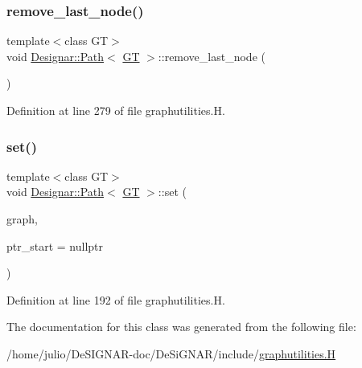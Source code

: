 \subsubsection{\texorpdfstring{remove\+\_\+last\+\_\+node()}{remove\_last\_node()}}
{\footnotesize\ttfamily template$<$class GT$>$ \\
void \hyperlink{class_designar_1_1_path}{Designar\+::\+Path}$<$ \hyperlink{demo-buildgraph_8_c_a3001c40d2c31ca87ed96cd7d1334a55e}{GT} $>$\+::remove\+\_\+last\+\_\+node (\begin{DoxyParamCaption}{ }\end{DoxyParamCaption})\hspace{0.3cm}{\ttfamily [inline]}}



Definition at line 279 of file graphutilities.\+H.

\mbox{\label{class_designar_1_1_path_a72190e285c2c85aae75b0c8435f1eee9}} 
\subsubsection{\texorpdfstring{set()}{set()}}
{\footnotesize\ttfamily template$<$class GT$>$ \\
void \hyperlink{class_designar_1_1_path}{Designar\+::\+Path}$<$ \hyperlink{demo-buildgraph_8_c_a3001c40d2c31ca87ed96cd7d1334a55e}{GT} $>$\+::set (\begin{DoxyParamCaption}\item[{\hyperlink{demo-buildgraph_8_c_a3001c40d2c31ca87ed96cd7d1334a55e}{GT} \&}]{graph,  }\item[{\hyperlink{class_designar_1_1_path_a7b499fd50e96e3360968d4cfef7a3736}{Node\+Type} $\ast$}]{ptr\+\_\+start = {\ttfamily nullptr} }\end{DoxyParamCaption})\hspace{0.3cm}{\ttfamily [inline]}}



Definition at line 192 of file graphutilities.\+H.



The documentation for this class was generated from the following file\+:\begin{DoxyCompactItemize}
\item 
/home/julio/\+De\+S\+I\+G\+N\+A\+R-\/doc/\+De\+Si\+G\+N\+A\+R/include/\hyperlink{graphutilities_8_h}{graphutilities.\+H}\end{DoxyCompactItemize}
